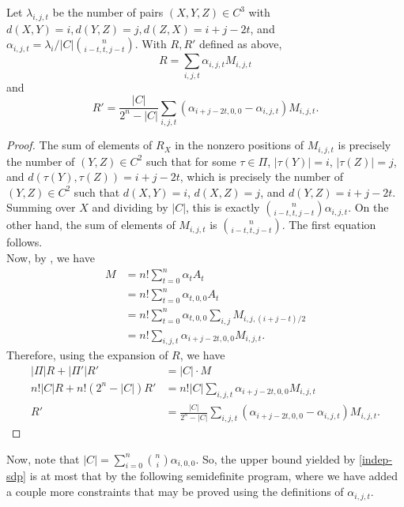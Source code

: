 	\begin{fprop}
		Let $\lambda_{i,j,t}$ be the number of pairs $(X,Y,Z) \in C^3$ with $d(X,Y) = i, d(Y,Z) = j, d(Z,X) = i+j-2t$, and $\alpha_{i,j,t} = \lambda_i / |C| \binom{n}{i-t,t,j-t}$.  With $R,R'$ defined as above,
		\[ R = \sum_{i,j,t} \alpha_{i,j,t} M_{i,j,t}  \]
		and
		\[ R' = \frac{|C|}{2^n - |C|} \sum_{i,j,t} (\alpha_{i+j-2t,0,0} - \alpha_{i,j,t}) M_{i,j,t}. \]
	\end{fprop}
	\begin{proof}
		The sum of elements of $R_X$ in the nonzero positions of $M_{i,j,t}$ is precisely the number of $(Y,Z) \in C^2$ such that for some $\tau \in \Pi$, $|\tau(Y)| = i$, $|\tau(Z)| = j$, and $d(\tau(Y),\tau(Z)) = i+j-2t$, which is precisely the number of $(Y,Z) \in C^2$ such that $d(X,Y) = i$, $d(X,Z) = j$, and $d(Y,Z) = i+j-2t$. Summing over $X$ and dividing by $|C|$, this is exactly $\binom{n}{i-t,t,j-t} \alpha_{i,j,t}$. On the other hand, the sum of elements of $M_{i,j,t}$ is $\binom{n}{i-t,t,j-t}$. The first equation follows.\\
		Now, by , we have
		\begin{align*}
			M &= n! \sum_{t=0}^{n} \alpha_t A_t \\
				&= n! \sum_{t=0}^{n} \alpha_{t,0,0} A_t \\
				&= n! \sum_{t=0}^{n} \alpha_{t,0,0} \sum_{i,j} M_{i,j,(i+j-t)/2} \\
				&= n! \sum_{i,j,t} \alpha_{i+j-2t,0,0} M_{i,j,t}.
		\end{align*}
		Therefore, using the expansion of $R$, we have
		\begin{align*}
			|\Pi| R + |\Pi'| R' &= |C| \cdot M \\
			n! |C| R + n! (2^n - |C|) R' &= n! |C| \sum_{i,j,t} \alpha_{i+j-2t,0,0} M_{i,j,t} \\
			R' &= \frac{|C|}{2^n - |C|} \sum_{i,j,t} (\alpha_{i+j-2t,0,0} - \alpha_{i,j,t}) M_{i,j,t}.
		\end{align*}
	\end{proof}

	Now, note that $|C| = \sum_{i=0}^{n} \binom{n}{i} \alpha_{i,0,0}$. So, the upper bound yielded by \cref{indep-sdp} is at most that by the following semidefinite program, where we have added a couple more constraints that may be proved using the definitions of $\alpha_{i,j,t}$.

